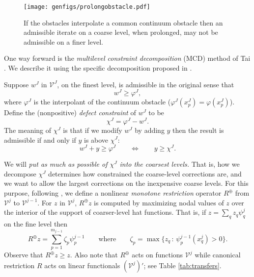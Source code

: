 \documentclass[letterpaper,final,12pt,reqno]{amsart}
\theoremstyle{claim}
\newcommand{\mR}{R^{\bm{\oplus}}}
\numberwithin{equation}{section}
\numberwithin{figure}{section}
\numberwithin{table}{section}
\numberwithin{theorem}{section}
\begin{document}
\begin{figure}
\qquad \texttt{[image: genfigs/prolongobstacle.pdf]}
\caption{If the obstacles interpolate a common continuum obstacle then an admissible iterate on a coarse level, when prolonged, may not be admissible on a finer level.}
\label{fig:prolongobstacle}
\end{figure}

One way forward is the \emph{multilevel constraint decomposition} (MCD) method of Tai \cite{Tai2003}.  We describe it using the specific decomposition proposed in \cite{GraeserKornhuber2009}.

Suppose $w^J$ in $\mathcal{V}^J$, on the finest level, is admissible in the original sense that
\begin{equation}
  w^J \ge \varphi^J, \label{eq:fineadmissibleiterate}
\end{equation}
where $\varphi^J$ is the interpolant of the continuum obstacle ($\varphi^J(x_p^J)=\varphi(x_p^J)$).  Define the (nonpositive) \emph{defect constraint} \cite{GraeserKornhuber2009} of $w^J$ to be
\begin{equation}
  \chi^J = \varphi^J - w^J.  \label{eq:defectconstraint}
\end{equation}
The meaning of $\chi^J$ is that if we modify $w^J$ by adding $y$ then the result is admissible if and only if $y$ is above $\chi^J$:
\begin{equation}
  w^J + y \ge \varphi^J  \qquad \iff \qquad y \ge \chi^J.  \label{eq:defectmeaning}
\end{equation}

We will \emph{put as much as possible of $\chi^J$ into the coarsest levels.}  That is, how we decompose $\chi^J$ determines how constrained the coarse-level corrections are, and we want to allow the largest corrections on the inexpensive coarse levels.  For this purpose, following \cite[equation (4.22)]{GraeserKornhuber2009}, we define a nonlinear \emph{monotone restriction} operator $\mR$ from $\mathcal{V}^j$ to $\mathcal{V}^{j-1}$.  For $z$ in $\mathcal{V}^j$, $\mR z$ is computed by maximizing nodal values of $z$ over the interior of the support of coarser-level hat functions.  That is, if $z = \sum_q z_q \psi_q^j$ on the fine level then
\begin{equation}
  \mR z = \sum_{p=1}^{m_{j-1}} \zeta_p \psi_p^{j-1} \qquad \text{where} \qquad \zeta_p = \max \{z_q \,:\, \psi_p^{j-1}(x_q^j) > 0\}.  \label{eq:monotonerestriction}
\end{equation}
Observe that $\mR z \ge z$.  Also note that $\mR$ acts on functions $\mathcal{V}^j$ while canonical restriction $R$ acts on linear functionals $(\mathcal{V}^j)'$; see Table \ref{tab:transfers}.
\end{document}
